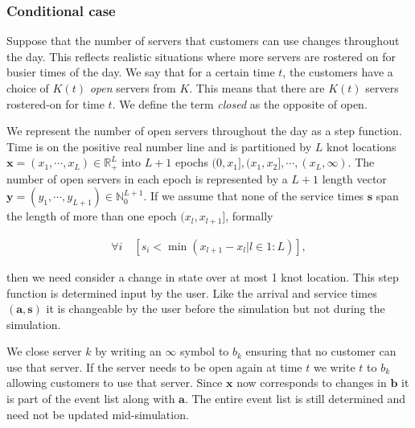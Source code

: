 \documentclass[article]{jss}
\begin{document}
\subsubsection{Conditional case}

Suppose that the number of servers that customers can use changes throughout the day. This reflects realistic situations where more servers are rostered on for busier times of the day. We say that for a certain time $t$, the customers have a choice of $K(t)$ \textit{open} servers from $K$. This means that there are $K(t)$ servers rostered-on for time $t$. We define the term \textit{closed} as the opposite of open. 

We represent the number of open servers throughout the day as a step function. Time is on the positive real number line and is partitioned by $L$ knot locations $\mathbf{x} = (x_1, \cdots, x_L ) \in \mathbb{R}^L_{+}$ into $L+1$ epochs $(0, x_1], (x_1, x_2], \cdots, (x_L, \infty)$. The number of open servers in each epoch is represented by a $L+1$ length vector $\mathbf{y} = (y_1, \cdots, y_{L+1} ) \in \mathbb{N}^{L+1}_0$. If we assume that none of the service times $\mathbf{s}$ span the length of more than one epoch $(x_{l}, x_{l+1}]$, formally

\begin{align}
\forall i \quad \left[ s_i < \min({ x_{l+1} - x_{l} | l \in 1:L }) \right] \label{eq:condition},
\end{align}

then we need consider a change in state over at most 1 knot location. This step function is determined input by the user. Like the arrival and service times $\mathbf{(a,s)}$ it is changeable by the user before the simulation but not during the simulation. 

We close server $k$ by writing an $\infty$ symbol to $b_k$ ensuring that no customer can use that server. If the server needs to be open again at time $t$ we write $t$ to $b_k$ allowing customers to use that server. Since $\mathbf{x}$ now corresponds to changes in $\mathbf{b}$ it is part of the event list along with $\mathbf{a}$. The entire event list is still determined and need not be updated mid-simulation. 
\end{document}
